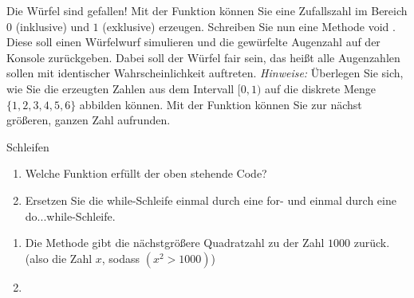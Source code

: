 \documentclass{../preamble}
\date{30.11.2020 - 04.12.2020}
\begin{document}
\maketitle

\makedisclaimer

\clearpage

\begin{task}[credit = \stars{1}{3}]{Die Würfel sind gefallen!}
    Mit der Funktion  können Sie eine Zufallszahl im Bereich \(0\) (inklusive) und \(1\) (exklusive) erzeugen. Schreiben Sie nun eine Methode \textcolor{keywordcolor}{void} .
    \br
    Diese soll einen Würfelwurf simulieren und die gewürfelte Augenzahl auf der Konsole zurückgeben. Dabei soll der Würfel fair sein, das heißt alle Augenzahlen sollen mit identischer Wahrscheinlichkeit auftreten.
    \br
    \textit{Hinweise:} Überlegen Sie sich, wie Sie die erzeugten Zahlen aus dem Intervall \([0,1)\) auf die diskrete Menge \(\{1, 2, 3, 4, 5, 6\}\) abbilden können. Mit der Funktion  können Sie zur nächst größeren, ganzen Zahl aufrunden.

    \begin{solution}
        
    \end{solution}
\end{task}

\clearpage

\begin{task}[credit = \stars{1}{3}]{Schleifen}
    
    \begin{enumerate}[label = (\arabic*)]
        \item Welche Funktion erfüllt der oben stehende Code?
        \item Ersetzen Sie die \textcolor{keywordcolor}{while}-Schleife einmal durch eine \textcolor{keywordcolor}{for}- und einmal durch eine \textcolor{keywordcolor}{do}...\textcolor{keywordcolor}{while}-Schleife.
    \end{enumerate}

    \begin{solution}
        \begin{enumerate}[label = (\arabic*)]
            \item Die Methode gibt die nächstgrößere Quadratzahl zu der Zahl \(1000\) zurück. (also die Zahl \(x\), sodass \((x^2 > 1000)\))
            \item
                  \noindent
                  
                  
        \end{enumerate}
    \end{solution}
\end{task}
\end{document}
